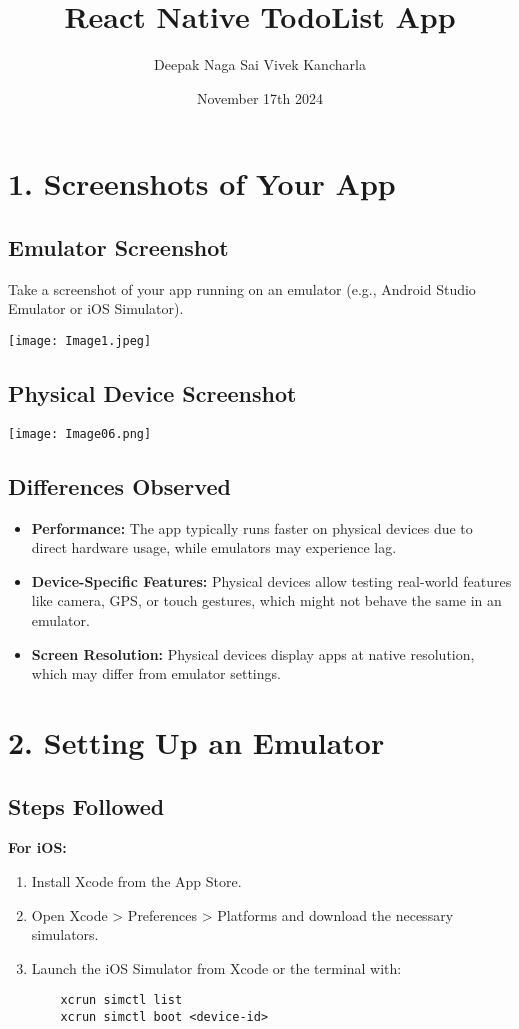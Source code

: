 \documentclass[12pt]{article}
\begin{document}
\title{React Native TodoList App}
\author{Deepak Naga Sai Vivek Kancharla}
\date{November 17th 2024}
\maketitle

\section*{1. Screenshots of Your App}
\subsection*{Emulator Screenshot}
Take a screenshot of your app running on an emulator (e.g., Android Studio Emulator or iOS Simulator).

\texttt{[image: Image1.jpeg]}


\subsection*{Physical Device Screenshot}
\texttt{[image: Image06.png]}
\subsection*{Differences Observed}
\begin{itemize}
    \item \textbf{Performance:} The app typically runs faster on physical devices due to direct hardware usage, while emulators may experience lag.
    \item \textbf{Device-Specific Features:} Physical devices allow testing real-world features like camera, GPS, or touch gestures, which might not behave the same in an emulator.
    \item \textbf{Screen Resolution:} Physical devices display apps at native resolution, which may differ from emulator settings.
\end{itemize}

\section*{2. Setting Up an Emulator}
\subsection*{Steps Followed}
\textbf{For iOS:}
\begin{enumerate}
    \item Install Xcode from the App Store.
    \item Open Xcode > Preferences > Platforms and download the necessary simulators.
    \item Launch the iOS Simulator from Xcode or the terminal with:
    \begin{verbatim}
    xcrun simctl list
    xcrun simctl boot <device-id>
    \end{verbatim}
\end{enumerate}
\end{document}
